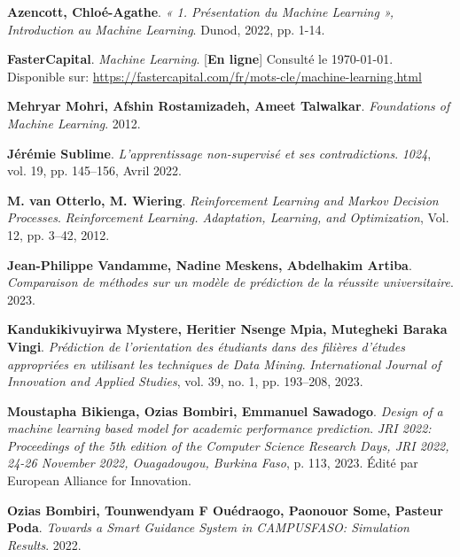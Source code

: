\begin{thebibliography}{9}
\textbf{Azencott, Chloé-Agathe}. \emph{« 1. Présentation du Machine Learning », Introduction au Machine Learning}. Dunod, 2022, pp. 1-14. 

\textbf{FasterCapital}. \emph{Machine Learning}. [\textbf{En ligne}] Consulté le \today. \\Disponible sur:
\url{https://fastercapital.com/fr/mots-cle/machine-learning.html}

\textbf{Mehryar Mohri, Afshin Rostamizadeh, Ameet Talwalkar}. \emph{Foundations of Machine Learning}. 2012.

\textbf{Jérémie Sublime}. \emph{L'apprentissage non-supervisé et ses contradictions}. \emph{1024}, vol. 19, pp. 145--156, Avril 2022.

\textbf{M. van Otterlo, M. Wiering}. \emph{Reinforcement Learning and Markov Decision Processes}. \emph{Reinforcement Learning. Adaptation, Learning, and Optimization}, Vol. 12, pp. 3–42, 2012.


\textbf{Jean-Philippe Vandamme, Nadine Meskens, Abdelhakim Artiba}. \emph{Comparaison de méthodes sur un modèle de prédiction de la réussite universitaire}. 2023.

\textbf{Kandukikivuyirwa Mystere, Heritier Nsenge Mpia, Mutegheki Baraka Vingi}. \emph{Prédiction de l'orientation des étudiants dans des filières d'études appropriées en utilisant les techniques de Data Mining}. \emph{International Journal of Innovation and Applied Studies}, vol. 39, no. 1, pp. 193--208, 2023.

\textbf{Moustapha Bikienga, Ozias Bombiri, Emmanuel Sawadogo}. \emph{Design of a machine learning based model for academic performance prediction}. \emph{JRI 2022: Proceedings of the 5th edition of the Computer Science Research Days, JRI 2022, 24-26 November 2022, Ouagadougou, Burkina Faso}, p. 113, 2023. Édité par European Alliance for Innovation.

\textbf{Ozias Bombiri, Tounwendyam F Ouédraogo, Paonouor Some, Pasteur Poda}. \emph{Towards a Smart Guidance System in CAMPUSFASO: Simulation Results}. 2022.

\end{thebibliography}